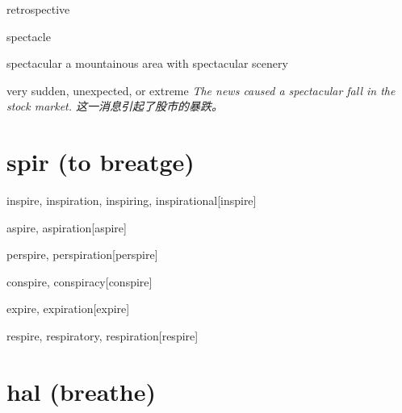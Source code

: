 \begin{RefWord}{retrospective}
\end{RefWord}

\begin{RefWord}{spectacle}
\end{RefWord}

\begin{RefWord}{spectacular}
    a mountainous area with spectacular scenery

    very sudden, unexpected, or extreme
    \textit{The news caused a spectacular fall in the stock market. 这一消息引起了股市的暴跌。}
\end{RefWord}


















\section{spir (to breatge)}





\begin{RefWord}{inspire, inspiration, inspiring, inspirational}[inspire]
\end{RefWord}

\begin{RefWord}{aspire, aspiration}[aspire]
\end{RefWord}

\begin{RefWord}{perspire, perspiration}[perspire]
\end{RefWord}

\begin{RefWord}{conspire, conspiracy}[conspire]
\end{RefWord}

\begin{RefWord}{expire, expiration}[expire]
\end{RefWord}

\begin{RefWord}{respire, respiratory, respiration}[respire]
\end{RefWord}


\section{hal (breathe)}

